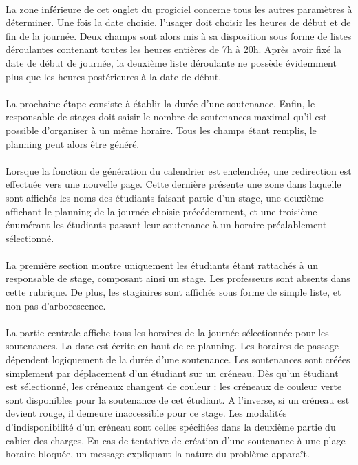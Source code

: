 \documentclass[a4paper,10pt]{report}
\begin{document}
		\paragraph{}
		  La zone inférieure de cet onglet du progiciel concerne tous les autres paramètres à déterminer.
		  Une fois la date choisie, l'usager doit choisir les heures de début et de fin de la journée.
		  Deux champs sont alors mis à sa disposition sous forme de listes déroulantes contenant toutes les heures entières de 7h à 20h.
		  Après avoir fixé la date de début de journée, la deuxième liste déroulante ne possède évidemment plus que les heures postérieures à la date de début.
		  
		\paragraph{}
		  La prochaine étape consiste à établir la durée d'une soutenance.
		  Enfin, le responsable de stages doit saisir le nombre de soutenances maximal qu'il est possible d'organiser à un même horaire.
		  Tous les champs étant remplis, le planning peut alors être généré.
		  
		\paragraph{}
		  Lorsque la fonction de génération du calendrier est enclenchée, une redirection est effectuée vers une nouvelle page.
		  Cette dernière présente une zone dans laquelle sont affichés les noms des étudiants faisant partie d'un stage, une deuxième affichant le planning de la journée choisie précédemment, et une troisième énumérant les étudiants passant leur soutenance à un horaire préalablement sélectionné.
		  
		\paragraph{}
		  La première section montre uniquement les étudiants étant rattachés à un responsable de stage, composant ainsi un stage.
		  Les professeurs sont absents dans cette rubrique. De plus, les stagiaires sont affichés sous forme de simple liste, et non pas d'arborescence.
		  
		\paragraph{}
		  La partie centrale affiche tous les horaires de la journée sélectionnée pour les soutenances.
		  La date est écrite en haut de ce planning.
		  Les horaires de passage dépendent logiquement de la durée d'une soutenance.
		  Les soutenances sont créées simplement par déplacement d'un étudiant sur un créneau.
		  Dès qu'un étudiant est sélectionné, les créneaux changent de couleur : les créneaux de couleur verte sont disponibles pour la soutenance de cet étudiant.
		  A l'inverse, si un créneau est devient rouge, il demeure inaccessible pour ce stage.
		  Les modalités d'indisponibilité d'un créneau sont celles spécifiées dans la deuxième partie du cahier des charges.
		  En cas de tentative de création d'une soutenance à une plage horaire bloquée, un message expliquant la nature du problème apparaît.
		  
\end{document}
